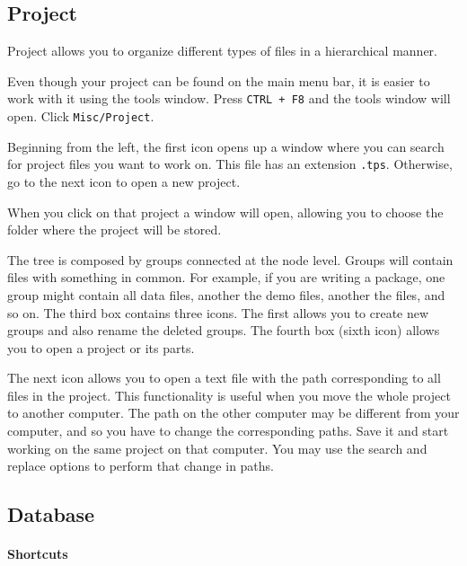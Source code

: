 \subsection{Project}

Project allows you to organize different types of files in a hierarchical manner.

Even though your project can be found on the main menu bar, it is easier to work with it using the tools window.
Press \texttt{CTRL + F8} and the tools window will open. Click \texttt{Misc/Project}.

Beginning from the left, the first icon opens up a window where you can search for project files you want to work on.
This file has an extension \texttt{.tps}. Otherwise, go to the next icon to open a new project.

When you click on that project a window will open, allowing you to choose the folder where the project will be stored.

The tree is composed by groups connected at the node level. Groups will contain files with something in common.
For example, if you are writing a package, one group might contain all data files,
another the demo files, another the \RR{} files, and so on. The third box contains three icons.
The first allows you to create new groups and also rename the  deleted groups.
The fourth box (sixth icon) allows you to  open a project or its parts.

The next icon allows you to open a text file with the path corresponding to all files in the project.
This functionality is useful when you move the whole project to another computer.
The path on the other computer may be different from your computer, and so you have to change the corresponding paths.
Save it and start working on the same project on that computer.
You may use the search and replace options to perform that change in paths.


\subsection{Database}

\paragraph{}\textbf{Shortcuts}\\

